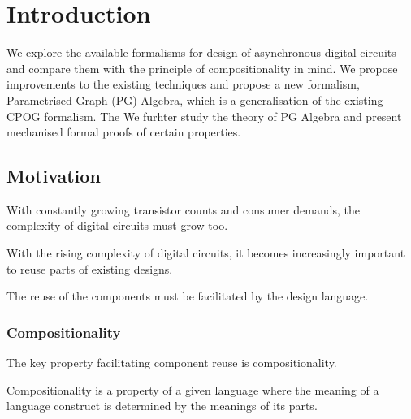 
\chapter{Introduction}

We explore the available formalisms for design of asynchronous digital
circuits and compare them with the principle of compositionality in
mind. We propose improvements to the existing techniques and
propose a new formalism, Parametrised Graph (PG) Algebra, which is a
generalisation of the existing CPOG formalism. The We furhter study 
the theory of PG Algebra and present mechanised formal proofs of certain properties.

\section{Motivation}

With constantly growing transistor counts and consumer demands, the complexity of digital circuits must grow too.

With the rising complexity of digital circuits, it becomes increasingly important to reuse parts of existing designs.

The reuse of the components must be facilitated by the design language.

\subsection{Compositionality}

The key property facilitating component reuse is compositionality.

Compositionality is a property of a given language where the meaning of a language construct is determined by the meanings of its parts.











